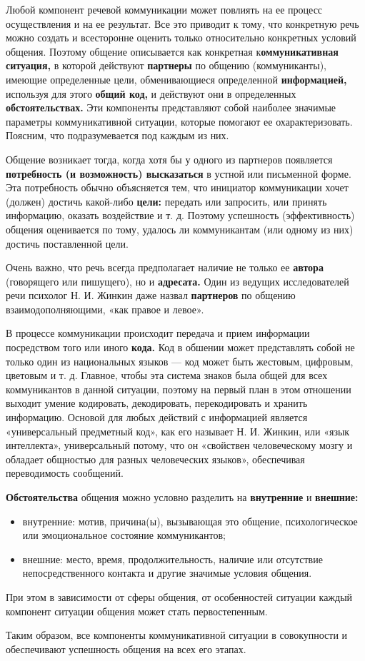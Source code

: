 Любой компонент речевой коммуникации может повлиять на ее процесс осуществления и на ее результат.
Все это приводит к тому, что конкретную речь можно создать и всесторонне оценить только относительно конкретных условий общения. Поэтому общение описывается как конкретная к\textbf{оммуникативная ситуация,} в которой действуют \textbf{партнеры} по общению (коммуниканты), имеющие определенные цели, обменивающиеся определенной \textbf{информацией,} используя для этого \textbf{общий код,} и действуют они в определенных \textbf{обстоятельствах.}
Эти компоненты представляют собой наиболее значимые параметры коммуникативной ситуации, которые помогают ее охарактеризовать.
Поясним, что подразумевается под каждым из них.

Общение возникает тогда, когда хотя бы у одного из партнеров появляется \textbf{потребность (и возможность) высказаться} в устной или письменной форме.
Эта потребность обычно объясняется тем, что инициатор коммуникации хочет (должен) достичь какой-либо \textbf{цели:} передать или запросить, или принять информацию, оказать воздействие и т. д.
Поэтому успешность (эффективность) общения оценивается по тому, удалось ли коммуникантам (или одному из них) достичь поставленной цели.

Очень важно, что речь всегда предполагает наличие не только ее \textbf{автора} (говорящего или пишущего), но и \textbf{адресата.}
Один из ведущих исследователей речи психолог Н. И. Жинкин даже назвал \textbf{партнеров} по общению взаимодополняющими, «как правое и левое».

В процессе коммуникации происходит передача и прием информации посредством того или иного \textbf{кода.}
Код в обшении может представлять собой не только один из национальных языков --- код может быть жестовым, цифровым, цветовым и т. д.
Главное, чтобы эта система знаков была общей для всех коммуникантов в данной ситуации, поэтому на первый план в этом отношении выходит умение кодировать, декодировать, перекодировать и хранить информацию.
Основой для любых действий с информацией является «универсальный предметный код», как его называет Н. И. Жинкин, или «язык интеллекта», универсальный потому, что он «свойствен человеческому мозгу и обладает общностью для разных человеческих языков», обеспечивая переводимость сообщений.

\textbf{Обстоятельства} общения можно условно разделить на \textbf{внутренние} и \textbf{внешние:}

\begin{itemize}
    \item внутренние: мотив, причина(ы), вызывающая это общение, психологическое или эмоциональное состояние коммуникантов;
    \item внешние: место, время, продолжительность, наличие или отсутствие непосредственного контакта и другие значимые условия общения.
\end{itemize}

При этом в зависимости от сферы общения, от особенностей ситуации каждый компонент ситуации общения может стать первостепенным.

Таким образом, все компоненты коммуникативной ситуации в совокупности и обеспечивают успешность общения на всех его этапах.
